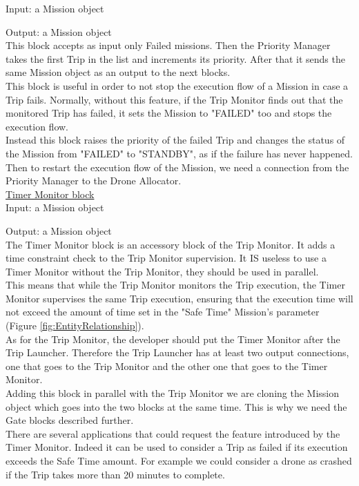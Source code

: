 Input: a Mission object

Output: a Mission object
\\
This block accepts as input only Failed missions.
Then the Priority Manager takes the first Trip in the list and increments its priority.
After that it sends the same Mission object as an output to the next blocks.
\\
This block is useful in order to not stop the execution flow of a Mission in case a Trip fails.
Normally, without this feature, if the Trip Monitor finds out that the monitored Trip has failed, it sets the Mission to "FAILED" too and stops the execution flow.
\\
Instead this block raises the priority of the failed Trip and changes the status of the Mission from "FAILED" to "STANDBY", as if the failure has never happened.
\\
Then to restart the execution flow of the Mission, we need a connection from the Priority Manager to the Drone Allocator.
\\

\underline{Timer Monitor block}
\\

Input: a Mission object

Output: a Mission object
\\

The Timer Monitor block is an accessory block of the Trip Monitor.
It adds a time constraint check to the Trip Monitor supervision. 
It IS useless to use a Timer Monitor without the Trip Monitor, they should be used in parallel.
\\
This means that while the Trip Monitor monitors the Trip execution, the Timer Monitor supervises the same Trip execution, ensuring that the execution time will not exceed the amount of time set in the "Safe Time" Mission's parameter (Figure \ref{fig:EntityRelationship}).
\\
As for the Trip Monitor, the developer should put the Timer Monitor after the Trip Launcher.
Therefore the Trip Launcher has at least two output connections, one that goes to the Trip Monitor and the other one that goes to the Timer Monitor.
\\
Adding this block in parallel with the Trip Monitor we are cloning the Mission object which goes into the two blocks at the same time. This is why we need the Gate blocks described further.
\\
There are several applications that could request the feature introduced by the Timer Monitor. 
Indeed it can be used to consider a Trip as failed if its execution exceeds the Safe Time amount.
For example we could consider a drone as crashed if the Trip takes more than 20 minutes to complete.
\\

